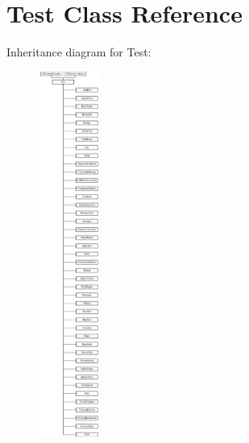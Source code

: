 \hypertarget{class_test}{\section{Test Class Reference}
\label{class_test}
}
Inheritance diagram for Test\-:\begin{figure}[H]
\begin{center}
\leavevmode
\includegraphics[height=12.000000cm]{class_test}
\end{center}
\end{figure}
